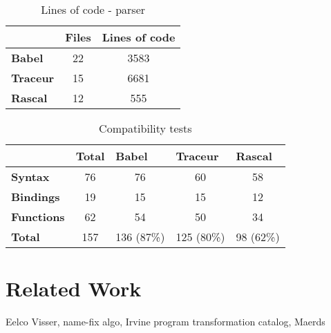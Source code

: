 \begin{table}[h]
\centering
\caption{Lines of code - parser}
\label{loc-parser}
\begin{tabular}{@{}lcc@{}}
\toprule
              & {\bf Files} & \multicolumn{1}{l}{{\bf Lines of code}} \\ \midrule
{\bf Babel}   & 22          & 3583                                    \\
{\bf Traceur} & 15          & 6681                                    \\
{\bf Rascal}  & 12          & 555                                    \\ \bottomrule
\end{tabular}
\end{table}

\begin{table}[h]
\centering
\caption{Compatibility tests}
\label{my-label}
\begin{tabular}{@{}lcccc@{}}
\toprule
                & {\bf Total} & \multicolumn{1}{l}{{\bf Babel}} & \multicolumn{1}{l}{{\bf Traceur}} & \multicolumn{1}{l}{{\bf Rascal}} \\ \midrule
{\bf Syntax}    & 76          & 76                              & 60                                & 58                               \\
{\bf Bindings}  & 19          & 15                              & 15                                & 12                               \\
{\bf Functions} & 62          & 54                              & 50                                & 34                               \\
{\bf Total}     & 157         & 136 (87\%)                      & 125 (80\%)                        & 98 (62\%)                        \\ \bottomrule
\end{tabular}
\end{table}

\section{Related Work}
Eelco Visser,
name-fix algo,
Irvine program transformation catalog,
Maerds

